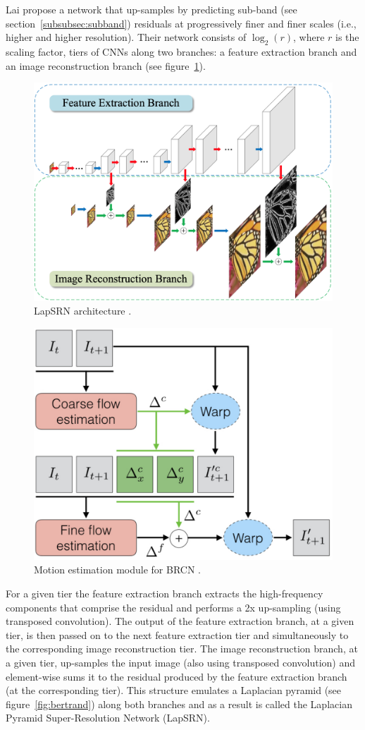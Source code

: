 Lai \etal \cite{Lai_2017} propose a network that up-samples by predicting sub-band (see section~\ref{subsubsec:subband}) residuals at progressively finer and finer scales (i.e., higher and higher resolution).
%
Their network consists of \(\log_2(r)\), where \(r\) is the scaling factor, tiers of CNNs along two branches: a feature extraction branch and an image reconstruction branch (see figure~\ref{fig:lapsrn}).
\begin{figure}[!htbp]
    \centering
    \begin{adjustbox}{width=\linewidth}
        \centering
        \includegraphics{figures/neural_networks/lapsrn.png}
    \end{adjustbox}
    \caption{LapSRN architecture \cite{Lai_2017}.}\label{fig:lapsrn}
\end{figure}
\begin{figure}[!htbp]
    \centering
    \includegraphics[width=.4\textwidth]{figures/neural_networks/motion_compensation.png}
    \caption{Motion estimation module for BRCN \cite{caballero2017real}.}\label{fig:motion_estimation}
\end{figure}
%
For a given tier the feature extraction branch extracts the high-frequency components that comprise the residual and performs a 2x up-sampling (using transposed convolution). 
%
The output of the feature extraction branch, at a given tier, is then passed on to the next feature extraction tier and simultaneously to the corresponding image reconstruction tier.
%
The image reconstruction branch, at a given tier, up-samples the input image (also using transposed convolution) and element-wise sums it to the residual produced by the feature extraction branch (at the corresponding tier).
%
This structure emulates a Laplacian pyramid (see figure~\ref{fig:bertrand}) along both branches and as a result is called the Laplacian Pyramid Super-Resolution Network (LapSRN).

